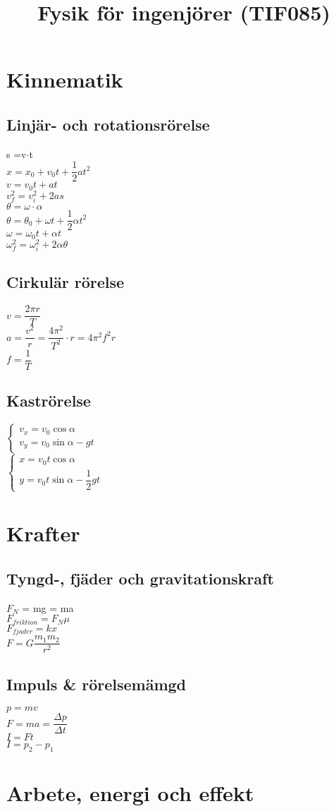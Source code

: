 \documentclass[a4paper]{article}
\begin{document}
\title{\center Fysik för ingenjörer (TIF085)}
\date{}
\maketitle
\section*{Kinnematik}
\subsection*{Linjär- och rotationsrörelse}
s =v$\cdot$t\\
$x=x_{0}+v_{0}t+\dfrac{1}{2}at^2$\\
$v = v_{0}t+at$\\
$v_{f}^2=v_{i}^2+2as$
\vspace{1em}\\
$\theta = \omega\cdot\alpha$\\
$\theta=\theta_{0}+\omega t+\dfrac{1}{2}\alpha t^2$\\
$\omega=\omega_{0}t+\alpha t$\\
$\omega_{f}^2=\omega_{i}^2+2\alpha \theta$
\subsection*{Cirkulär rörelse}
$v=\dfrac{2\pi r}{T}$\\
$a=\dfrac{v^2}{r}=\dfrac{4\pi^2}{T^2}\cdot r = 4\pi^2f^2r$\\
$f=\dfrac{1}{T}$
\subsection*{Kaströrelse}
$
\begin{cases}
v_{x} = v_{0}\cos\alpha\\
v_{y} = v_{0}\sin\alpha -gt
\end{cases}
$
\vspace{1em}\\
$
\begin{cases}
x = v_{0}t\cos\alpha\\
y = v_{0}t\sin\alpha -\dfrac{1}{2}gt
\end{cases}
$
\section*{Krafter}
\subsection*{Tyngd-, fjäder och gravitationskraft}
$F_{N}$ = mg = ma\\
$F_{friktion} = F_{N}\mu $\\
$F_{fjader}= kx$\\
$F=G\dfrac{m_{1}m_{2}}{r^2}$
\subsection*{Impuls \& rörelsemämgd}
$p=mv$\\
$F=ma = \dfrac{\Delta p}{\Delta t}$\\
$I=Ft$\\
$I = p_{2}-p_{1}$

\section*{Arbete, energi och effekt}
\end{document}
